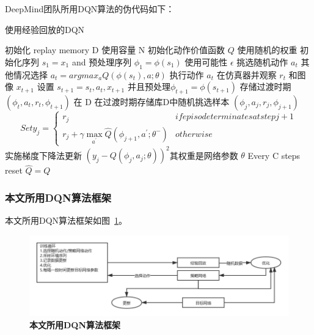 DeepMind团队所用DQN算法的伪代码如下：\\
\begin{algorithm}[H]  
  \caption{使用经验回放的DQN}  
  \begin{algorithmic}
    \State 初始化 replay memory D 使用容量 N
    \State 初始化动作价值函数 $Q$ 使用随机的权重 
    \State 初始化序列 $s_1={x_1}$ and 预处理序列 $\phi_1=\phi (s_1)$
    \State 使用可能性 $\epsilon$ 挑选随机动作 $a_t$
    \State 其他情况选择 $a_t=argmax_aQ(\phi(s_t),a;\theta)$
    \State 执行动作 $a_t$ 在仿真器并观察 $r_t$ 和图像 $x_{t+1}$
    \State 设置 $s_{t+1}=s_t,a_t,x_{t+1}$ 并且预处理$\phi_{t+1}=\phi(s_{t+1})$
    \State 存储过渡时期 $(\phi_t,a_t,r_t,\phi_{t+1})$ 在 D
    \State 在过渡时期存储库D中随机挑选样本 $(\phi_j,a_j,r_j,\phi_{j+1})$ 
    \State $$
    Set y_j=\begin{cases}
      r_j & if episode terminates at step j+1\\
      r_j+\gamma\max_{a^{'}}\hat{Q}(\phi_{j+1},a^{'};\theta^{-})&  otherwise
    \end{cases}
    $$
    \State 实施梯度下降法更新 $(y_j-Q(\phi_j,a_j;\theta))^2$其权重是网络参数 $\theta$
    \State Every C steps reset $\hat{Q}=Q$
    \EndFor 
    \EndFor
  \end{algorithmic}  
\end{algorithm}
\subsubsection{本文所用DQN算法框架}
本文所用DQN算法框架如图~\ref{fig:3-6}。
\begin{figure}[H]
  \centering
  \includegraphics[width=0.7\linewidth]{fig/dqn_2.png}
  \caption{\textbf{本文所用DQN算法框架}}
  \label{fig:3-6}
\end{figure}

